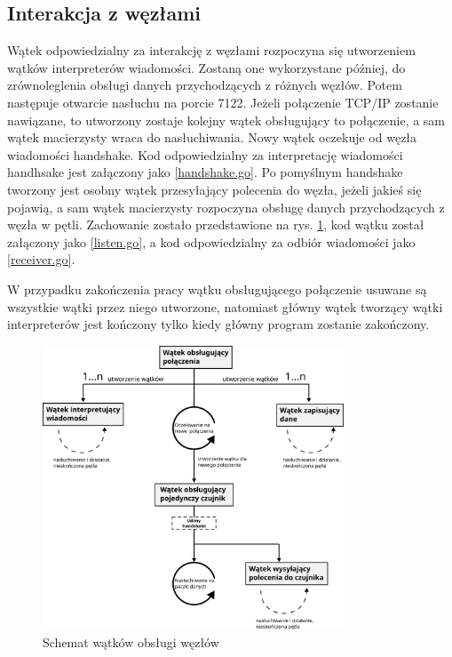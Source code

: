 \documentclass[12pt,oneside,a4paper]{book}
\theoremstyle{break}
\begin{document}
\subsection{Interakcja z węzłami}
Wątek odpowiedzialny za interakcję z węzłami rozpoczyna się utworzeniem
wątków interpreterów wiadomości. Zostaną one 
wykorzystane później, do zrównoleglenia obsługi danych przychodzących 
z różnych węzłów. Potem następuje otwarcie
nasłuchu na porcie 7122. Jeżeli połączenie TCP/IP zostanie nawiązane, to
utworzony zostaje kolejny wątek obsługujący to połączenie, a sam wątek 
macierzysty wraca do nasłuchiwania. Nowy wątek oczekuje od węzła
wiadomości handshake. Kod odpowiedzialny
za interpretację wiadomości handhsake jest
załączony jako \ref*{handshake.go}. Po pomyślnym handshake tworzony jest osobny wątek 
przesyłający polecenia do węzła, jeżeli jakieś się pojawią, a sam
wątek macierzysty rozpoczyna obsługę danych
przychodzących z węzła w pętli. 
Zachowanie zostało przedstawione na rys. \ref{rys:server-sensor-flow},
kod wątku został załączony jako \ref*{listen.go}, 
a kod odpowiedzialny za odbiór wiadomości
jako \ref*{receiver.go}.
\par W przypadku zakończenia pracy wątku obsługującego połączenie usuwane
są wszystkie wątki przez niego utworzone, natomiast główny wątek 
tworzący wątki interpreterów jest kończony tylko kiedy
główny program zostanie zakończony. 

\begin{figure}[H]
    \begin{center}
        \includegraphics[width=0.8\textwidth]{schemat_watkow_obslugi_czujnikow.png}        
        \caption{Schemat wątków obsługi węzłów}        
        \label{rys:server-sensor-flow}
    \end{center}
\end{figure}
\end{document}
